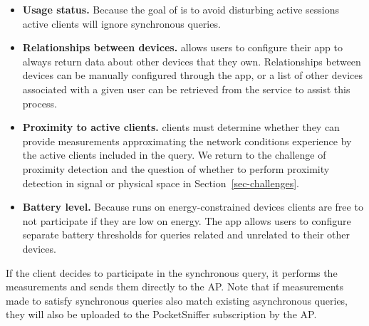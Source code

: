 \begin{itemize}

\item \textbf{Usage status.} Because the goal of \PS{} is to avoid disturbing
active sessions active clients will ignore synchronous queries.

\item \textbf{Relationships between devices.} \PS{} allows users to
configure their app to always return data about other devices that they own.
Relationships between devices can be manually configured through the app,
or a list of other devices associated with a given user can be retrieved from
the \PS{} service to assist this process.

\item \textbf{Proximity to active clients.} \PS{} clients must determine
whether they can provide measurements approximating the network conditions
experience by the active clients included in the query. We return to the
challenge of proximity detection and the question of whether to perform
proximity detection in signal or physical space in
Section~\ref{sec-challenges}.

\item \textbf{Battery level.} Because \PS{} runs on energy-constrained
  devices clients are free to not participate if they are low on energy. The
  \PS{} app allows users to configure separate battery thresholds for queries
  related and unrelated to their other devices.

\end{itemize}

If the client decides to participate in the synchronous query, it performs
the measurements and sends them directly to the AP. Note that if measurements
made to satisfy synchronous queries also match existing asynchronous queries,
they will also be uploaded to the PocketSniffer subscription by the AP.
